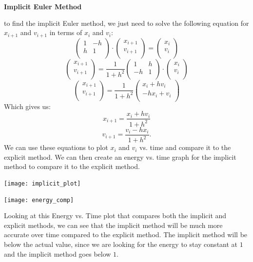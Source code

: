 \documentclass[10pt]{report}
\begin{document}
\noindent\textbf{Implicit Euler Method}

to find the implicit Euler method, we just need to solve the following equation for $x_{i+1}$ and $v_{i+1}$ in terms of $x_i$ and $v_i$:
$$\begin{pmatrix}
1 & -h \\
h & 1 \\
\end{pmatrix}\cdot\begin{pmatrix}
x_{i+1} \\
v_{i+1} \\\end{pmatrix}=\begin{pmatrix}
x_i \\
v_i \\
\end{pmatrix}$$
$$\begin{pmatrix}
x_{i+1} \\
v_{i+1} \\\end{pmatrix}=\frac{1}{1+h^2}\begin{pmatrix}
1 & h \\
-h & 1 \\\end{pmatrix}\cdot\begin{pmatrix}
x_i \\
v_i \\
\end{pmatrix}$$
$$\begin{pmatrix}
x_{i+1} \\
v_{i+1} \\\end{pmatrix}=\frac{1}{1+h^2}\begin{pmatrix}
x_i+hv_i \\
-hx_i+v_i \\\end{pmatrix}$$
Which gives us:
$$x_{i+1}=\frac{x_i+hv_i}{1+h^2}$$
$$v_{i+1}=\frac{v_i-hx_i}{1+h^2}.$$
We can use these equations to plot $x_i$ and $v_i$ vs. time and compare it to the explicit method. We can then create an energy vs. time graph for the implicit method to compare it to the explicit method. 

\texttt{[image: implicit\_plot]}

\texttt{[image: energy\_comp]}

Looking at this Energy vs. Time plot that compares both the implicit and explicit methods, we can see that the implicit method will be much more accurate over time compared to the explicit method. The implicit method will be below the actual value, since we are looking for the energy to stay constant at $1$ and the implicit method goes below $1$. 
\end{document}
